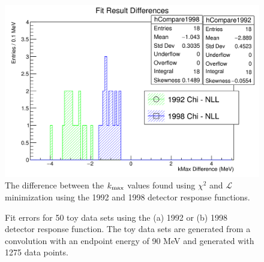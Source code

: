\begin{figure}[h]
  \centering
  \includegraphics[width=0.8\linewidth]{figures/png/compare_fit_results_92_v_98_unrestrictedOnly.png}
  \caption{The difference between the $\mbox{$k_{\rm max}$}$ values found using $\chi^2$ and
    $\mathcal{L}$ minimization using the 1992 and 1998 detector response functions.}
  \label{fig:compareFits}
\end{figure}

\begin{figure}[h]
  \centering
  \hfill
  \caption{Fit errors for 50 toy data sets using the (a) 1992 or (b) 1998 detector response function.
    The toy data sets are generated from a convolution with an endpoint energy of 90 MeV and generated
    with 1275 data points.
  }
  \label{fig:ToyFitErrs}
\end{figure}

